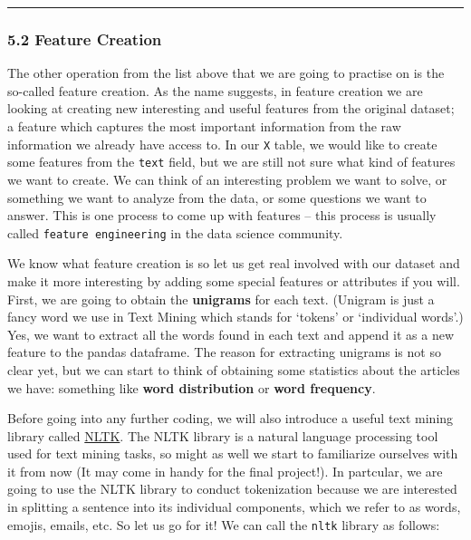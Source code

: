 \documentclass[11pt]{article}
\begin{document}
    \begin{center}\rule{0.5\linewidth}{\linethickness}\end{center}

    \hypertarget{feature-creation}{%
\subsubsection{5.2 Feature Creation}\label{feature-creation}}

The other operation from the list above that we are going to practise on
is the so-called feature creation. As the name suggests, in feature
creation we are looking at creating new interesting and useful features
from the original dataset; a feature which captures the most important
information from the raw information we already have access to. In our
\texttt{X} table, we would like to create some features from the
\texttt{text} field, but we are still not sure what kind of features we
want to create. We can think of an interesting problem we want to solve,
or something we want to analyze from the data, or some questions we want
to answer. This is one process to come up with features -- this process
is usually called \texttt{feature\ engineering} in the data science
community.

We know what feature creation is so let us get real involved with our
dataset and make it more interesting by adding some special features or
attributes if you will. First, we are going to obtain the
\textbf{unigrams} for each text. (Unigram is just a fancy word we use in
Text Mining which stands for `tokens' or `individual words'.) Yes, we
want to extract all the words found in each text and append it as a new
feature to the pandas dataframe. The reason for extracting unigrams is
not so clear yet, but we can start to think of obtaining some statistics
about the articles we have: something like \textbf{word distribution} or
\textbf{word frequency}.

Before going into any further coding, we will also introduce a useful
text mining library called \href{http://www.nltk.org/}{NLTK}. The NLTK
library is a natural language processing tool used for text mining
tasks, so might as well we start to familiarize ourselves with it from
now (It may come in handy for the final project!). In partcular, we are
going to use the NLTK library to conduct tokenization because we are
interested in splitting a sentence into its individual components, which
we refer to as words, emojis, emails, etc. So let us go for it! We can
call the \texttt{nltk} library as follows:
\end{document}
